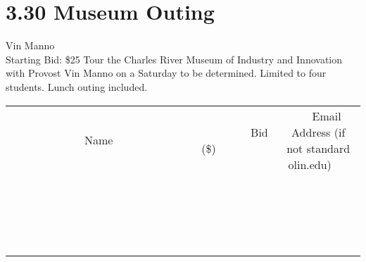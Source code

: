 \documentclass[11pt]{article}
\begin{document}
\section*{3.30 Museum Outing}
Vin Manno
\\
Starting Bid: \$25
\newline
Tour the Charles River Museum of Industry and Innovation with Provost Vin Manno on a Saturday to be determined. Limited to four students. Lunch outing included.
\\[3ex]
\begin{tabular}{c c c}
~~~~~~~~~~~~~Name~~~~~~~~~~~~~ & ~~~~~~~~~Bid (\$)~~~~~~~~~  & ~~~Email Address (if not standard olin.edu)~~~\\
 & & \\
\hline
 & & \\
\hline
 & & \\
\hline
 & & \\
\hline
 & & \\
\hline
 & & \\
\hline
 & & \\
\hline
 & & \\
\hline
 & & \\
\hline
 & & \\
\hline
 & & \\
\hline
 & & \\
\hline
 & & \\
\hline
 & & \\
\hline
 & & \\
\hline
 & & \\
\hline
 & & \\
\hline
 & & \\
\hline
 & & \\
\hline
\end{tabular}
\newpage
\end{document}
